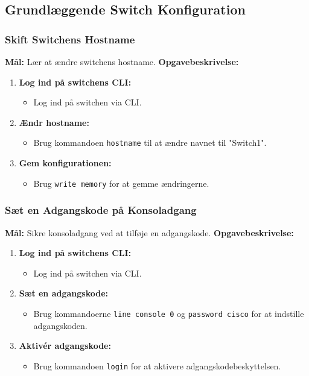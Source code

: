 \subsection{Grundlæggende Switch Konfiguration}
\subsubsection*{Skift Switchens Hostname}
\textbf{Mål:} Lær at ændre switchens hostname.
\newline\newline\noindent
\textbf{Opgavebeskrivelse:}
\begin{enumerate}
	\item \textbf{Log ind på switchens CLI:}
	\begin{itemize}
		\item Log ind på switchen via CLI.
	\end{itemize}
	\item \textbf{Ændr hostname:}
	\begin{itemize}
		\item Brug kommandoen \texttt{hostname} til at ændre navnet til "Switch1".
	\end{itemize}
	\item \textbf{Gem konfigurationen:}
	\begin{itemize}
		\item Brug \texttt{write memory} for at gemme ændringerne.
	\end{itemize}
\end{enumerate}

\subsubsection*{Sæt en Adgangskode på Konsoladgang}
\textbf{Mål:} Sikre konsoladgang ved at tilføje en adgangskode.
\newline\newline\noindent
\textbf{Opgavebeskrivelse:}
\begin{enumerate}
	\item \textbf{Log ind på switchens CLI:}
	\begin{itemize}
		\item Log ind på switchen via CLI.
	\end{itemize}
	\item \textbf{Sæt en adgangskode:}
	\begin{itemize}
		\item Brug kommandoerne \texttt{line console 0} og \texttt{password cisco} for at indstille adgangskoden.
	\end{itemize}
	\item \textbf{Aktivér adgangskode:}
	\begin{itemize}
		\item Brug kommandoen \texttt{login} for at aktivere adgangskodebeskyttelsen.
	\end{itemize}
\end{enumerate}

